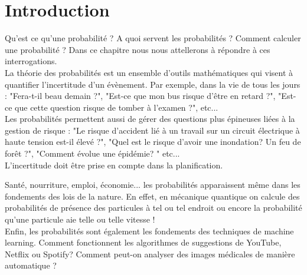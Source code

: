 \newpage
\section{Introduction}
Qu'est ce qu'une probabilité ? A quoi servent les probabilités ? 
Comment calculer une probabilité ? 
Dans ce chapitre nous nous attellerons à répondre à ces interrogations. \\

La théorie des probabilités est un ensemble d'outils mathématiques qui visent à 
quantifier l'incertitude d'un évènement. Par exemple, dans la vie de tous les jours : 
"Fera-t-il beau demain ?", "Est-ce que mon bus risque d'être en retard ?", 
"Est-ce que cette question risque de tomber à l'examen ?", etc... \\

Les probabilités permettent aussi de gérer des questions plus épineuses liées à la gestion 
de risque : "Le risque d'accident lié à un travail sur un circuit électrique à haute tension 
est-il élevé ?", "Quel est le risque d'avoir une inondation? Un feu de forêt ?", "Comment évolue une épidémie? "
 etc... \\

L'incertitude doit être prise en compte dans la planification.

Santé, nourriture, emploi, économie... les probabilités apparaissent même dans les fondements des lois de la nature. En effet, 
en mécanique quantique on calcule des probabilités de présence des particules à tel ou 
tel endroit ou encore la probabilité qu'une particule aie telle ou telle vitesse ! \\

Enfin, les probabilités sont également les fondements des techniques de machine learning. 
Comment fonctionnent les algorithmes de suggestions de YouTube, Netflix ou Spotify?
Comment peut-on analyser des images médicales de manière automatique ?



